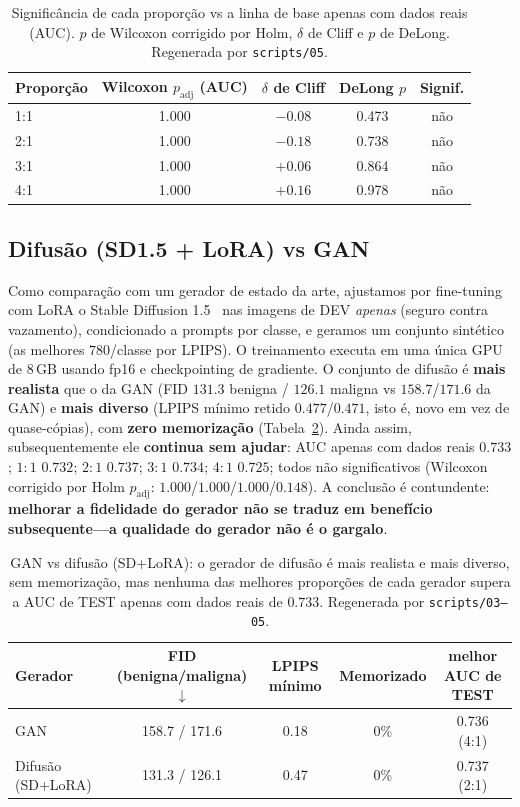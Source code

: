 \documentclass[runningheads]{llncs}
\begin{document}
\begin{table}[t]
\centering
\caption{Significância de cada proporção vs a linha de base apenas com dados reais
(AUC). $p$ de Wilcoxon corrigido por Holm, $\delta$ de Cliff e $p$ de DeLong.
Regenerada por \texttt{scripts/05}.}
\label{tab:stats}
\begin{tabular}{lcccc}
\toprule
Proporção & Wilcoxon $p_{\text{adj}}$ (AUC) & $\delta$ de Cliff & DeLong $p$ & Signif. \\
\midrule
1:1 & 1.000 & $-0.08$ & 0.473 & não \\
2:1 & 1.000 & $-0.18$ & 0.738 & não \\
3:1 & 1.000 & $+0.06$ & 0.864 & não \\
4:1 & 1.000 & $+0.16$ & 0.978 & não \\
\bottomrule
\end{tabular}
\end{table}

\subsection{Difusão (SD1.5 + LoRA) vs GAN}
Como comparação com um gerador de estado da arte, ajustamos por fine-tuning com
LoRA o Stable Diffusion 1.5~\cite{rombach2022ldm,hu2022lora} nas imagens de DEV
\emph{apenas} (seguro contra vazamento), condicionado a prompts por classe, e
geramos um conjunto sintético (as melhores $780$/classe por LPIPS). O treinamento
executa em uma única GPU de 8\,GB usando fp16 e checkpointing de gradiente. O
conjunto de difusão é \textbf{mais realista} que o da GAN (FID $131.3$ benigna /
$126.1$ maligna vs $158.7$/$171.6$ da GAN) e \textbf{mais diverso} (LPIPS mínimo
retido $0.477$/$0.471$, isto é, novo em vez de quase-cópias), com \textbf{zero
memorização} (Tabela~\ref{tab:diffusion}). Ainda assim, subsequentemente ele
\textbf{continua sem ajudar}: AUC apenas com dados reais $0.733$; $1{:}1$
$0.732$; $2{:}1$ $0.737$; $3{:}1$ $0.734$; $4{:}1$ $0.725$; todos não
significativos (Wilcoxon corrigido por Holm $p_\text{adj}$:
$1.000$/$1.000$/$1.000$/$0.148$). A conclusão é contundente: \textbf{melhorar a
fidelidade do gerador não se traduz em benefício subsequente---a qualidade do
gerador não é o gargalo}.

\begin{table}[t]
\centering
\caption{GAN vs difusão (SD+LoRA): o gerador de difusão é mais realista e mais
diverso, sem memorização, mas nenhuma das melhores proporções de cada gerador
supera a AUC de TEST apenas com dados reais de $0.733$. Regenerada por
\texttt{scripts/03--05}.}
\label{tab:diffusion}
\begin{tabular}{lcccc}
\toprule
Gerador & FID (benigna/maligna) $\downarrow$ & LPIPS mínimo & Memorizado & melhor AUC de TEST \\
\midrule
GAN & 158.7 / 171.6 & 0.18 & 0\% & 0.736 (4:1) \\
Difusão (SD+LoRA) & 131.3 / 126.1 & 0.47 & 0\% & 0.737 (2:1) \\
\bottomrule
\end{tabular}
\end{table}
\end{document}
